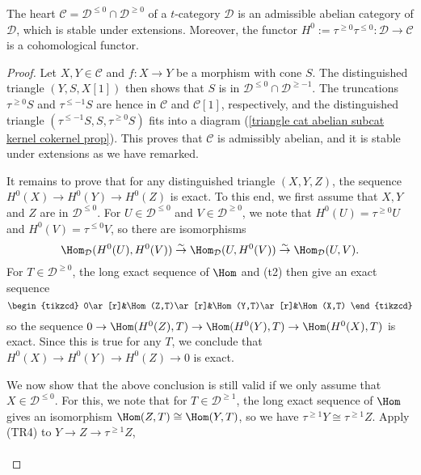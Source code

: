 \begin{theorem}\label{triangle cat t-structure heart admissible abelian}
The heart $\mathcal{C}=\mathcal{D}^{\leq 0}\cap\mathcal{D}^{\geq 0}$ of a $t$-category $\mathcal{D}$ is an admissible abelian category of $\mathcal{D}$, which is stable under extensions. Moreover, the functor $H^0:=\tau^{\geq 0}\tau^{\leq 0}:\mathcal{D}\to\mathcal{C}$ is a cohomological functor.
\end{theorem}
\begin{proof}
Let $X,Y\in\mathcal{C}$ and $f:X\to Y$ be a morphism with cone $S$. The distinguished triangle $(Y,S,X[1])$ then shows that $S$ is in $\mathcal{D}^{\leq 0}\cap\mathcal{D}^{\geq -1}$. The truncations $\tau^{\geq 0}S$ and $\tau^{\leq -1}S$ are hence in $\mathcal{C}$ and $\mathcal{C}[1]$, respectively, and the distinguished triangle $(\tau^{\leq-1}S,S,\tau^{\geq 0}S)$ fits into a diagram (\ref{triangle cat abelian subcat kernel cokernel prop}). This proves that $\mathcal{C}$ is admissibly abelian, and it is stable under extensions as we have remarked.\par
It remains to prove that for any distinguished triangle $(X,Y,Z)$, the sequence $H^0(X)\to H^0(Y)\to H^0(Z)$ is exact. To this end, we first assume that $X,Y$ and $Z$ are in $\mathcal{D}^{\leq 0}$. For $U\in\mathcal{D}^{\leq 0}$ and $V\in\mathcal{D}^{\geq 0}$, we note that $H^0(U)=\tau^{\geq 0}U$ and $H^0(V)=\tau^{\leq 0}V$, so there are isomorphisms
\[\Hom_{\mathcal{D}}(H^0(U),H^0(V))\stackrel{\sim}{\to} \Hom_{\mathcal{D}}(U,H^0(V))\stackrel{\sim}{\to}\Hom_{\mathcal{D}}(U,V).\] 
For $T\in\mathcal{D}^{\geq 0}$, the long exact sequence of $\Hom$ and (t2) then give an exact sequence
\[\begin{tikzcd}
0\ar[r]&\Hom(Z,T)\ar[r]&\Hom(Y,T)\ar[r]&\Hom(X,T)
\end{tikzcd}\]
so the sequence $0\to\Hom(H^0(Z),T)\to\Hom(H^0(Y),T)\to\Hom(H^0(X),T)$ is exact. Since this is true for any $T$, we conclude that $H^0(X)\to H^0(Y)\to H^0(Z)\to 0$ is exact.\par
We now show that the above conclusion is still valid if we only assume that $X\in\mathcal{D}^{\leq 0}$. For this, we note that for $T\in\mathcal{D}^{\geq 1}$, the long exact sequence of $\Hom$ gives an isomorphism $\Hom(Z,T)\cong\Hom(Y,T)$, so we have $\tau^{\geq 1}Y\cong\tau^{\geq 1}Z$. Apply (TR4) to $Y\to Z\to\tau^{\geq 1}Z$,
\vspace*{-3mm}
\begin{equation*}
\begin{tikzcd}[row sep=2pt,column sep=4pt]

\end{tikzcd}
\end{equation*}
\end{proof}
